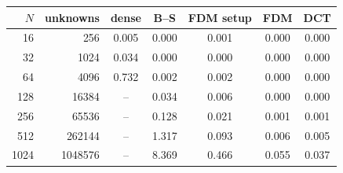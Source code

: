 \begin{tabular}{rr ccccc}
\toprule
$N$ & unknowns & dense & B--S & FDM setup & FDM & DCT\\
\midrule
16 & 256 & 0.005 & 0.000 & 0.001 & 0.000 & 0.000\\
32 & 1024 & 0.034 & 0.000 & 0.000 & 0.000 & 0.000\\
64 & 4096 & 0.732 & 0.002 & 0.002 & 0.000 & 0.000\\
128 & 16384 & -- & 0.034 & 0.006 & 0.000 & 0.000\\
256 & 65536 & -- & 0.128 & 0.021 & 0.001 & 0.001\\
512 & 262144 & -- & 1.317 & 0.093 & 0.006 & 0.005\\
1024 & 1048576 & -- & 8.369 & 0.466 & 0.055 & 0.037\\
\bottomrule
\end{tabular}
